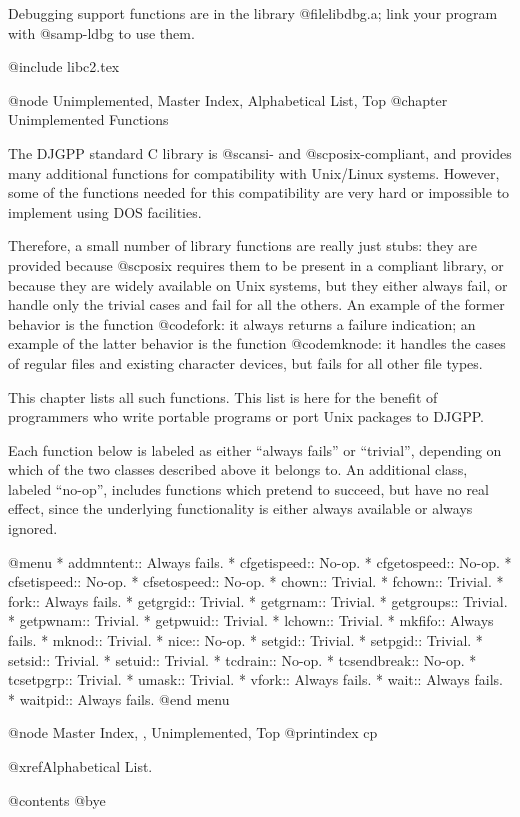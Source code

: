 Debugging support functions are in the library @file{libdbg.a}; link
your program with @samp{-ldbg} to use them.

@include libc2.tex

@node Unimplemented, Master Index, Alphabetical List, Top
@chapter Unimplemented Functions

The DJGPP standard C library is @sc{ansi}- and @sc{posix}-compliant, and
provides many additional functions for compatibility with Unix/Linux
systems.  However, some of the functions needed for this compatibility
are very hard or impossible to implement using DOS facilities.

Therefore, a small number of library functions are really just stubs:
they are provided because @sc{posix} requires them to be present in a
compliant library, or because they are widely available on Unix systems,
but they either always fail, or handle only the trivial cases and fail
for all the others.  An example of the former behavior is the function
@code{fork}: it always returns a failure indication; an example of the
latter behavior is the function @code{mknode}: it handles the cases of
regular files and existing character devices, but fails for all other
file types.

This chapter lists all such functions.  This list is here for the
benefit of programmers who write portable programs or port Unix packages
to DJGPP.

Each function below is labeled as either ``always fails'' or
``trivial'', depending on which of the two classes described above it
belongs to.  An additional class, labeled ``no-op'', includes functions
which pretend to succeed, but have no real effect, since the underlying
functionality is either always available or always ignored.

@menu
* addmntent::                Always fails.
* cfgetispeed::              No-op.
* cfgetospeed::              No-op.
* cfsetispeed::              No-op.
* cfsetospeed::              No-op.
* chown::                    Trivial.
* fchown::                   Trivial.
* fork::                     Always fails.
* getgrgid::                 Trivial.
* getgrnam::                 Trivial.
* getgroups::                Trivial.
* getpwnam::                 Trivial.
* getpwuid::                 Trivial.
* lchown::                   Trivial.
* mkfifo::                   Always fails.
* mknod::                    Trivial.
* nice::                     No-op.
* setgid::                   Trivial.
* setpgid::                  Trivial.
* setsid::                   Trivial.
* setuid::                   Trivial.
* tcdrain::                  No-op.
* tcsendbreak::              No-op.
* tcsetpgrp::                Trivial.
* umask::                    Trivial.
* vfork::                    Always fails.
* wait::                     Always fails.
* waitpid::                  Always fails.
@end menu

@node Master Index, , Unimplemented, Top
@printindex cp

@xref{Alphabetical List}.

@contents
@bye

